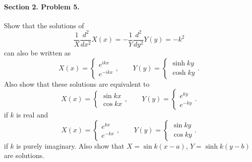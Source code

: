 \documentclass[10pt]{article}
\newcommand\dd[3][]{\frac{d^{#1}{#2}}{d {#3}^{#1}}}
\begin{document}
        \paragraph{Section 2. Problem 5.} Show that the solutions of 
        \[
                \frac{1}{X} \dd[2]{}{x}X(x) = - \frac{1}{Y} \dd[2]{}{y}Y(y) = -k^2
        \]
        can also be written as
        \[
                X(x) = \begin{cases}e^{ikx} \\ e^{-ikx}\end{cases}, \quad\quad
                Y(y) = \begin{cases}\sinh{ky} \\ \cosh{ky}\end{cases}.
        \]
        Also show that these solutions are equivalent to 
        \[
                X(x) = \begin{cases}\sin{kx} \\ \cos{kx}\end{cases}, \quad\quad
                Y(y) = \begin{cases}e^{ky} \\ e^{-ky}\end{cases}.
        \]
        if $k$ is real and
        \[
                X(x) = \begin{cases}e^{kx} \\ e^{-kx}\end{cases}, \quad\quad
                Y(y) = \begin{cases}\sin{ky} \\ \cos{ky}\end{cases}.
        \]
        if $k$ is purely imaginary. Also show that $X = \sin{k(x - a)}$, $Y = \sinh{k(y - b)}$ are solutions. \\
\end{document}
